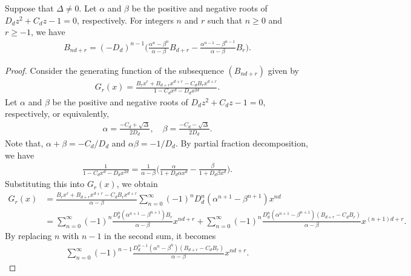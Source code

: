 \documentclass[10pt,a4paper]{amsart}
\begin{document}
\begin{theorem} \label{Th:Binet_Formula} Suppose that $ \Delta \neq 0 $. Let $ \alpha $ and $ \beta $ be the positive and negative roots of $ D_d z^2 + C_d z - 1 = 0 $, respectively. For integers $ n $ and $ r $ such that $ n \geq 0 $ and $ r \geq -1 $, we have
\begin{align*}
	B_{nd + r} = (-D_d)^{n - 1} \bigg( \frac{\alpha^n - \beta^n}{\alpha - \beta} B_{d + r} - \frac{\alpha^{n - 1} - \beta^{n - 1}}{\alpha - \beta} B_r \bigg).
\end{align*}
\end{theorem}

\begin{proof}
Consider the generating function of the subsequence $ (B_{nd + r}) $ given by
\begin{align*}
	G_r (x) = \frac{B_r x^r + B_{d + r} x^{d + r} - C_d B_r x^{d + r}}{1 - C_d x^d - D_d x^{2d}}.
\end{align*}
Let $ \alpha $ and $ \beta $ be the positive and negative roots of $ D_d z^2 + C_d z - 1 = 0 $, respectively, or equivalently,
\begin{align*}
	\alpha = \frac{-C_d + \sqrt{\Delta}}{2D_d}, \quad \beta = \frac{-C_d - \sqrt{\Delta}}{2D_d}.
\end{align*}
Note that, $ \alpha + \beta = -C_d/D_d $ and $ \alpha \beta = -1/D_d $. By partial fraction decomposition, we have
\begin{align*}
	\frac{1}{1 - C_d x^d - D_d x^{2d}} = \frac{1}{\alpha - \beta} \bigg( \frac{\alpha}{1 + D_d \alpha x^d} - \frac{\beta}{1 + D_d \beta x^d} \bigg).	
\end{align*}
Substituting this into $ G_r (x) $, we obtain
\begin{align*}
	G_r (x) &= \frac{B_r x^r + B_{d + r} x^{d + r} - C_d B_r x^{d + r}}{\alpha - \beta} \sum_{n = 0}^\infty (-1)^n D_d^n (\alpha^{n + 1} - \beta^{n + 1}) x^{nd} \\
	&= \sum_{n = 0}^\infty (-1)^n \frac{D_d^n (\alpha^{n + 1} - \beta^{n + 1}) B_r}{\alpha - \beta} x^{nd + r} + \sum_{n = 0}^\infty (-1)^n \frac{D_d^n (\alpha^{n + 1} - \beta^{n + 1}) (B_{d + r} - C_d B_r)}{\alpha - \beta} x^{(n + 1)d + r}. 
\end{align*}
By replacing $ n $ with $ n - 1 $ in the second sum, it becomes
\begin{align*}
	\sum_{n = 0}^\infty (-1)^{n - 1} \frac{D_d^{n - 1} (\alpha^n - \beta^n) (B_{d + r} - C_d B_r)}{\alpha - \beta} x^{nd + r}.
\end{align*}

\end{proof}
\end{document}
